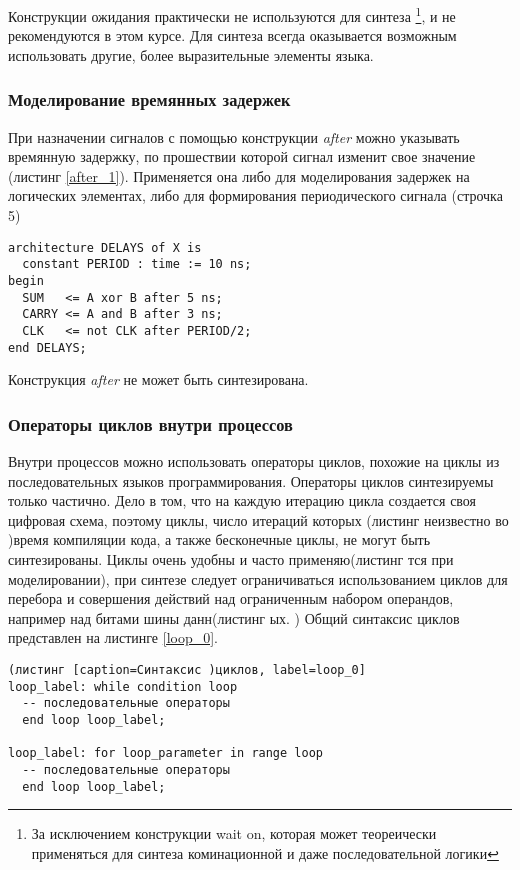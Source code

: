 Конструкции ожидания практически не используются для синтеза \footnote{За исключением конструкции wait on, которая может теореически применяться для синтеза коминационной и даже последовательной логики}, и не рекомендуются в этом курсе. Для синтеза всегда оказывается возможным использовать другие, более выразительные элементы языка.

\subsubsection{Моделирование времянных задержек}

При назначении сигналов с помощью конструкции \emph{after} можно указывать времянную задержку, по прошествии которой сигнал изменит свое значение (листинг \ref{after_1}). Применяется она либо для моделирования задержек на логических элементах, либо для формирования периодического сигнала (строчка 5)

\begin{Code}
\begin{lstlisting}[caption=Назначение сигналов с задержкой, label=after_1]
architecture DELAYS of X is
  constant PERIOD : time := 10 ns;
begin
  SUM   <= A xor B after 5 ns;
  CARRY <= A and B after 3 ns;
  CLK   <= not CLK after PERIOD/2;
end DELAYS;
\end{lstlisting}
\end{Code}

Конструкция \emph{after} не может быть синтезирована.

\subsubsection{Операторы циклов внутри процессов}

Внутри процессов можно использовать операторы циклов, похожие на циклы из последовательных языков программирования. Операторы циклов синтезируемы только частично. Дело в том, что на каждую итерацию цикла создается своя цифровая схема, поэтому циклы, число итераций которых (листинг неизвестно во )время компиляции кода, а также бесконечные циклы, не могут быть синтезированы. Циклы очень удобны и часто применяю(листинг тся при моделировании), при синтезе следует ограничиваться использованием циклов для перебора и совершения действий над ограниченным набором операндов, например над битами шины данн(листинг ых.
)
Общий синтаксис циклов представлен на листинге \ref{loop_0}.

\begin{Code}
\begin{lstlisting}(листинг [caption=Синтаксис )циклов, label=loop_0]
loop_label: while condition loop
  -- последовательные операторы
  end loop loop_label;

loop_label: for loop_parameter in range loop
  -- последовательные операторы
  end loop loop_label;
\end{lstlisting}
\end{Code}


